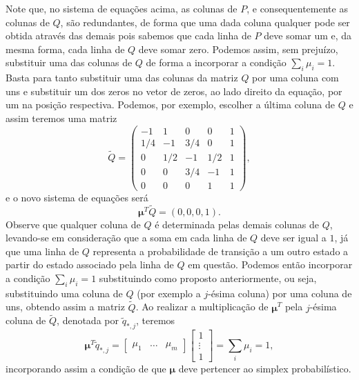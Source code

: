\begin{questions}
\begin{solution}
\begin{parts}
Note que, no sistema de equações acima,
as colunas de $P$, e consequentemente as colunas de $Q$, são redundantes,
de forma que uma dada coluna qualquer pode ser obtida através das demais
pois sabemos que cada linha de $P$ deve somar um e, da mesma forma,
cada linha de $Q$ deve somar zero. Podemos assim, sem prejuízo,
substituir uma das colunas de $Q$ de forma a incorporar a condição $\sum_i \mu_i = 1$. Basta
para tanto substituir uma das colunas da matriz $Q$ por uma coluna com uns e substituir
um dos zeros no vetor de zeros, ao lado direito da equação, por um na posição respectiva.
Podemos, por exemplo, escolher a última coluna de $Q$ e assim teremos uma matriz
\begin{equation}
\tilde{Q} = \begin{pmatrix} 
-1  &  1  & 0   & 0   & 1 \\
1/4 & -1  & 3/4 & 0   & 1 \\
0   & 1/2 & -1  & 1/2 & 1 \\
0   & 0   & 3/4 & -1  & 1 \\
0   & 0   & 0   & 1   & 1
\end{pmatrix} ,
\end{equation}
e o novo sistema de equações será
\begin{equation}
\mathbf{\mu}^T \tilde{Q} = (0, 0, 0, 1) .
\label{eq-novo-sistema}
\end{equation}
Observe que qualquer coluna de $Q$ é determinada pelas demais colunas de $Q$, levando-se
em consideração que a soma em cada linha de $Q$ deve ser igual a $1$, já que uma linha de $Q$
representa a probabilidade de transição a um outro estado a partir do estado associado pela
linha de $Q$ em questão. Podemos então incorporar a condição $\sum_i \mu_i = 1$ substituindo
como proposto anteriormente, ou seja, substituindo uma coluna de $Q$ (por exemplo a $j$-ésima coluna)
por uma coluna de uns, obtendo assim a matriz $\tilde{Q}$.
Ao realizar a multiplicação de $\mathbf{\mu}^T$ pela $j$-ésima coluna de $\tilde{Q}$,
denotada por $\tilde{q}_{\ast,j}$, teremos
\begin{equation} 
\mathbf{\mu}^T \tilde{q}_{\ast,j} = \begin{bmatrix}\mu_1 & \ldots & \mu_m \end{bmatrix} 
        \begin{bmatrix} 1\\ \vdots \\ 1 \end{bmatrix} =  \sum_i \mu_i = 1 ,
\end{equation}
incorporando assim a condição de que $\mathbf{\mu}$ deve pertencer ao simplex probabilístico.


\end{parts}
\end{solution}
\end{questions}
